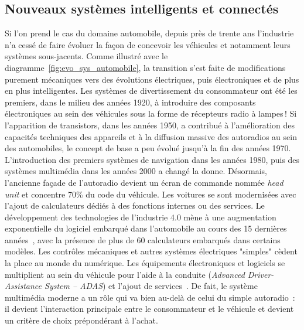 \documentclass[french, a4paper, 11pt, twoside, pdftex]{StyleThese}
\begin{document}
	\subsection{Nouveaux systèmes intelligents et connectés}
		Si l'on prend le cas du domaine automobile, depuis près de trente ans l'industrie n'a cessé de faire évoluer la façon de concevoir les véhicules et notamment leurs systèmes sous-jacents. Comme illustré avec le  diagramme~\ref{fig:evo_sys_automobile}, la transition s'est faite de modifications purement mécaniques vers des évolutions électriques, puis électroniques et de plus en plus intelligentes. Les systèmes de divertissement du consommateur ont été les premiers, dans le milieu des années 1920, à introduire des composants électroniques au sein des véhicules sous la forme de récepteurs radio à lampes ! Si l’apparition de transistors, dans les années 1950, a contribué à	l’amélioration des capacités techniques des appareils et à la diffusion massive des autoradios au sein des automobiles, le concept de base a peu évolué jusqu'à la fin des années 1970. L’introduction des premiers systèmes de navigation dans les années 1980, puis des systèmes multimédia dans les années 2000 a changé la donne. Désormais, l'ancienne façade de l’autoradio devient un écran de commande nommée \emph{head unit} et concentre 70\% du code du véhicule.	Les voitures se sont modernisées avec l'ajout de calculateurs dédiés à des fonctions internes ou des services. Le développement des technologies de l'industrie {4.0} mène à une augmentation exponentielle du logiciel embarqué dans l'automobile au cours des 15 dernières années~\cite{blanchet_industrie_2016}, avec la présence de plus de 60 calculateurs embarqués dans certains modèles. Les contrôles mécaniques et autres systèmes électriques "simples" cèdent la place au monde du numérique. Les équipements électroniques et logiciels se multiplient au sein du véhicule pour l’aide à la conduite (\textit{Advanced Driver-Assistance System -- ADAS}) et l’ajout de services~\cite{schmidt_automotive_2010}. De fait, le système multimédia moderne a un rôle qui va bien au-delà de celui du simple autoradio~: il devient l'interaction principale entre le consommateur et le véhicule et devient un critère de choix prépondérant à l'achat.
		
\end{document}
